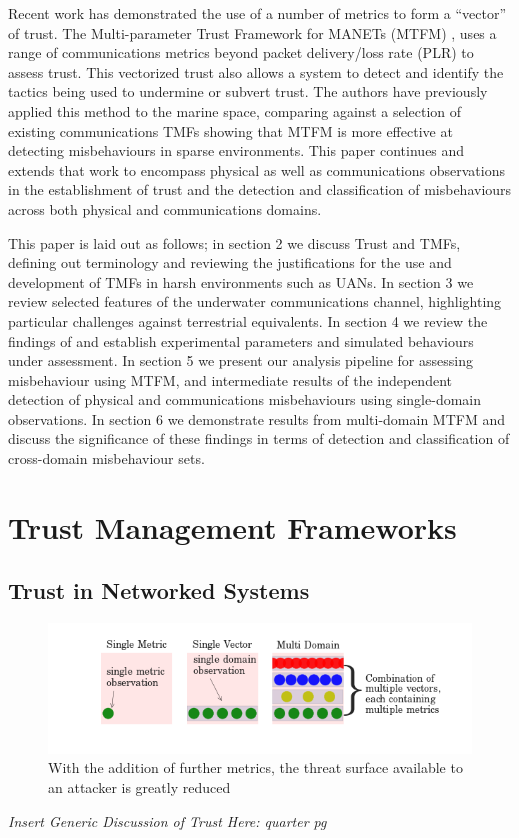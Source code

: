 \documentclass{aamas2016}
\begin{document}
Recent work has demonstrated the use of a number of metrics to form a ``vector'' of trust. The Multi-parameter Trust Framework for MANETs (MTFM) \cite{Guo11}, uses a range of communications metrics beyond packet delivery/loss rate (PLR) to assess trust. This vectorized trust also allows a system to detect and identify the tactics being used to undermine or subvert trust. The authors have previously applied this method to the marine space, comparing against a selection of existing communications TMFs \cite{Bolster2015b} showing that MTFM is more effective at detecting misbehaviours in sparse environments. This paper continues and extends that work to encompass physical as well as communications observations in the establishment of trust and the detection and classification of misbehaviours across both physical and communications domains. 

This paper is laid out as follows; in section 2 we discuss Trust and TMFs, defining out terminology and reviewing the justifications for the use and development of TMFs in harsh environments such as UANs.
In section 3 we review selected features of the underwater communications channel, highlighting particular challenges against terrestrial equivalents. 
In section 4 we review the findings of \cite{Bolster2015b} and establish experimental parameters and simulated behaviours under assessment. 
In section 5 we present our analysis pipeline for assessing misbehaviour using MTFM, and intermediate results of the independent detection of physical and communications misbehaviours using single-domain observations. 
In section 6 we demonstrate results from multi-domain MTFM and discuss the significance of these findings in terms of detection and classification of cross-domain misbehaviour sets.

\section{Trust Management Frameworks}

\subsection{Trust in Networked Systems}

\begin{figure}[h!]
	\centering
	\includegraphics[width=0.9\linewidth]{threat_surface_sum}
	
	\caption{With the addition of further metrics, the threat surface available to an attacker is greatly reduced}
\end{figure}
\textit{Insert Generic Discussion of Trust Here: quarter pg}
\end{document}
